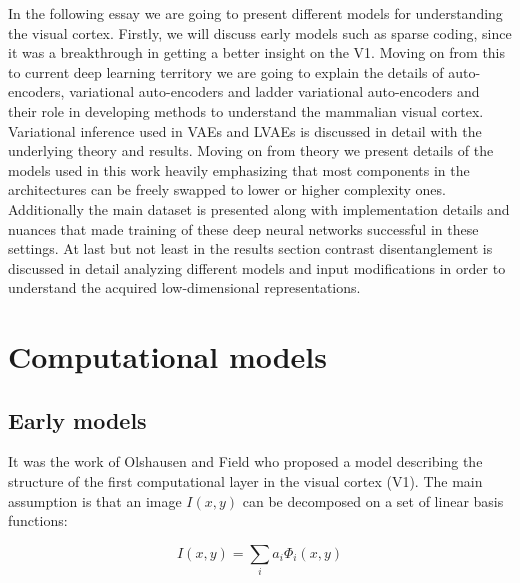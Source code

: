 \documentclass[12pt, english]{article}
\begin{document}
\vspace{7mm}

\par In the following essay we are going to present different models for understanding the visual cortex. Firstly, we will discuss early models such as sparse coding, since it was a breakthrough in getting a better insight on the V1. Moving on from this to current deep learning territory we are going to explain the details of auto-encoders, variational auto-encoders and ladder variational auto-encoders and their role in developing methods to understand the mammalian visual cortex. Variational inference used in VAEs and LVAEs is discussed in detail with the underlying theory and results. Moving on from theory we present details of the models used in this work heavily emphasizing that most components in the architectures can be freely swapped to lower or higher complexity ones. Additionally the main dataset is presented along with implementation details and nuances that made training of these deep neural networks successful in these settings. At last but not least in the results section contrast disentanglement is discussed in detail analyzing different models and input modifications in order to understand the acquired low-dimensional representations. 

\newpage

\section{Computational models}

\vspace{7mm}

\subsection{Early models}

\vspace{5mm}

\par It was the work of Olshausen and Field \cite{olshausen1996emergence} who proposed a model describing the structure of the first computational layer in the visual cortex (V1). The main assumption is that an image $I(x, y)$ can be decomposed on a set of linear basis functions:

\vspace{4mm}

\begin{equation}
    I(x, y) = \sum_{i}a_i \Phi_{i}(x, y)
\end{equation}
\end{document}
